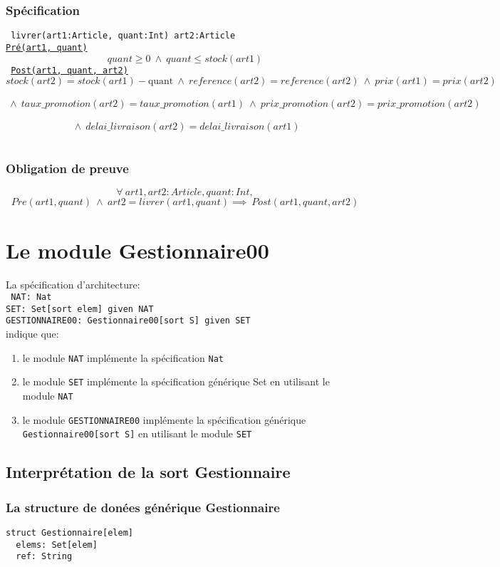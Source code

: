 \documentclass{article}
\begin{document}
\subsubsection{Spécification}
{\tt
livrer(art1:Article, quant:Int) art2:Article\\
\underline{Pré(art1, quant)}
$$ quant \ge 0\ \wedge\ quant \le stock(art1) $$
\underline{Post(art1, quant, art2)}
$$ stock(art2) = stock(art1) - \text{quant}\ \wedge\ reference(art2) = reference(art2)\ \wedge\ prix(art1) = prix(art2) $$
$$ \ \wedge\ taux\_promotion(art2) = taux\_promotion(art1)\ \wedge\ prix\_promotion(art2) = prix\_promotion(art2)$$
$$ \ \wedge\ delai\_livraison(art2) = delai\_livraison(art1)$$
}

\subsubsection{Obligation de preuve}
$$ \forall\ art1,art2:Article, quant:Int,$$
$$ Pre(art1,quant)\ \wedge\ art2 = livrer(art1,quant) \implies\ Post(art1, quant, art2) $$

\section{Le module Gestionnaire00}
La spécification d'architecture:\\
{\tt
NAT: Nat\\
SET: Set[sort elem] given NAT\\
GESTIONNAIRE00: Gestionnaire00[sort S] given SET\\
}
indique que:
\begin{enumerate}
\item le module \texttt{NAT} implémente la spécification \texttt{Nat}
\item le module \texttt{SET} implémente la spécification générique Set en utilisant le module \texttt{NAT}
\item le module \texttt{GESTIONNAIRE00} implémente la spécification générique \texttt{Gestionnaire00[sort S]} en utilisant le module \texttt{SET}
\end{enumerate}

\subsection{Interprétation de la sort Gestionnaire}
\subsubsection{La structure de donées générique Gestionnaire}
\begin{verbatim}
struct Gestionnaire[elem]
  elems: Set[elem]
  ref: String
\end{verbatim}
\end{document}

